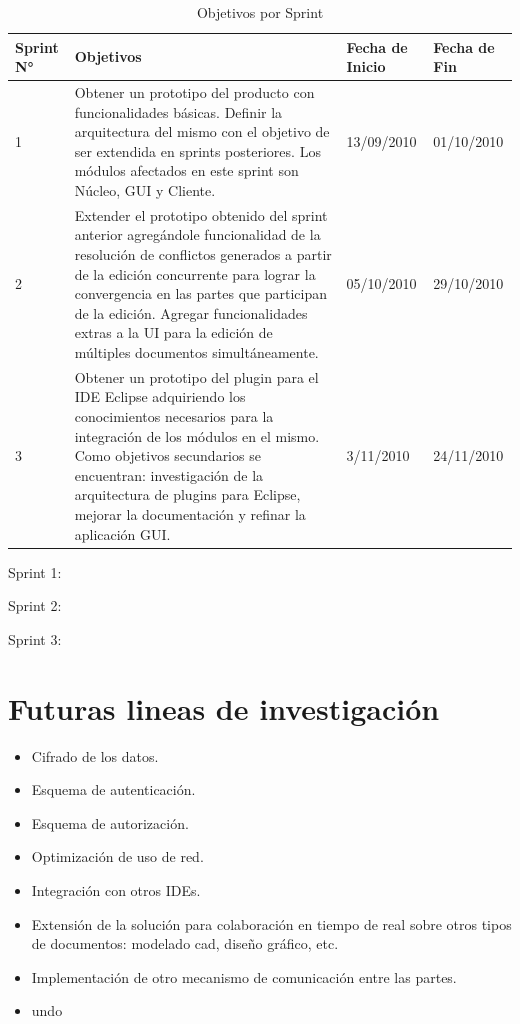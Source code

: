 \documentclass[12pt,a4paper]{article}
\begin{document}
\begin{table}
    \begin{tabular}{ | l | p{6.5cm} | p{2cm} | p{2cm} | }
    \hline
	Sprint N° & Objetivos & Fecha de Inicio & Fecha de Fin \\ \hline

	1 & Obtener un prototipo del producto con funcionalidades básicas. Definir la arquitectura del mismo con el
	objetivo de ser extendida en sprints posteriores. Los módulos afectados en este sprint son Núcleo, GUI y Cliente.
	& 13/09/2010 & 01/10/2010 \\ \hline

	2 & Extender el prototipo obtenido del sprint anterior agregándole funcionalidad de la resolución de conflictos
	generados a partir de la edición concurrente para lograr la convergencia en las partes que participan de la edición.
	Agregar funcionalidades extras a la UI para la edición de múltiples documentos simultáneamente.
	& 05/10/2010 & 29/10/2010 \\ \hline

	3 & Obtener un prototipo del plugin para el IDE Eclipse adquiriendo los conocimientos necesarios para la integración de los
	módulos en el mismo. Como objetivos secundarios se encuentran: investigación de la arquitectura de plugins para Eclipse, mejorar
	la documentación y refinar la aplicación GUI.
	& 3/11/2010 & 24/11/2010 \\ \hline

    \end{tabular}
    \caption{\label{soluciones_comparacion} Objetivos por Sprint}
\end{table}

Sprint 1: 

Sprint 2:

Sprint 3:

\section{Futuras lineas de investigación}

\begin{itemize}
	\item Cifrado de los datos.
	\item Esquema de autenticación.
	\item Esquema de autorización.
	\item Optimización de uso de red.
	\item Integración con otros IDEs.
	\item Extensión de la solución para colaboración en tiempo de real sobre otros tipos de documentos: modelado cad,
	diseño gráfico, etc.
	\item Implementación de otro mecanismo de comunicación entre las partes.
	\item undo
\end{itemize}
\end{document}
